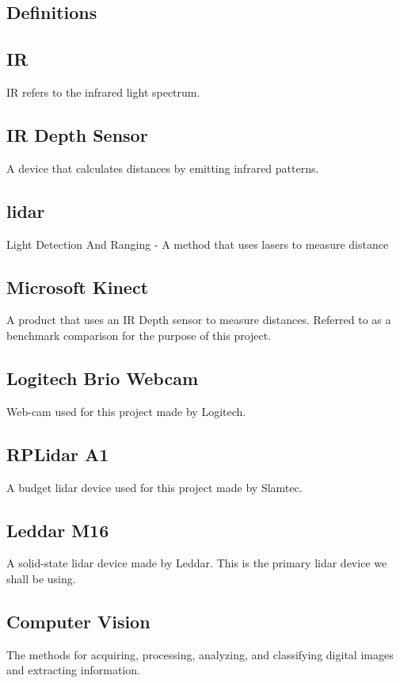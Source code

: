\documentclass[onecolumn, draftclsnofoot,10pt, compsoc]{IEEEtran}
\begin{document}
\begin{singlespace}
	\section{Definitions}
		\subsection{IR}\label{def:IR}
		IR refers to the infrared light spectrum.

		\subsection{IR Depth Sensor}\label{def:depthsensor}
		A device that calculates distances by emitting infrared patterns. 
		
		\subsection{lidar}\label{def:lidar}
		Light Detection And Ranging - A method that uses lasers to measure distance
		
		\subsection{Microsoft Kinect}\label{def:kinect}
		A product that uses an IR Depth sensor to measure distances.
		Referred to as a benchmark comparison for the purpose of this project.
		
		\subsection{Logitech Brio Webcam}\label{def:brio}
		Web-cam used for this project made by Logitech. \cite{logitech}
		
		\subsection{RPLidar A1}\label{def:rplidar}
		A budget lidar device used for this project made by Slamtec. \cite{slamtec}

		\subsection{Leddar M16}\label{def:m16}
		A solid-state lidar device made by Leddar.
		This is the primary lidar device we shall be using.

		\subsection{Computer Vision }\label{def:vision}
		The methods for acquiring, processing, analyzing, and classifying digital images and extracting information.


\end{singlespace}
\end{document}
